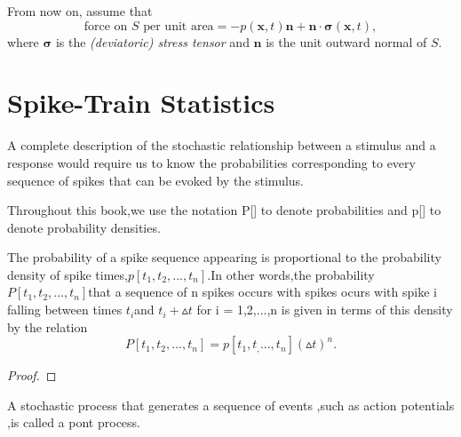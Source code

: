 
\begin{asm}
  \label{asm:surfaceForceViscous}
  From now on,
  assume that
  \begin{equation}
    \label{eq:surfaceForceSigma}
    \text{force on $S$ per unit area} = -p(\mathbf{x},t)\mathbf{n}+\mathbf{n}\cdot\boldsymbol\sigma(\mathbf{x},t),
  \end{equation}
  where $\boldsymbol\sigma$ is the \emph{(deviatoric) stress tensor} and
  $\mathbf{n}$ is the unit outward normal of $S$.
\end{asm}


\section{Spike-Train Statistics}
\label{sec:1.4}


\begin{defn}
    A complete description of the stochastic relationship between a stimulus and a response would require us to know the probabilities corresponding to every sequence of spikes that can be evoked by the stimulus.    
\end{defn}

\begin{defn}    
    Throughout this book,we use the notation P[] to denote probabilities and p[] to denote probability densities.
\end{defn}    

\begin{thm}
    The probability of a spike sequence appearing is proportional to the probability density of spike times,$p[t_1,t_2,...,t_n]$.In other words,the probability $P[t_1,t_2,...,t_n]$that a sequence of n spikes occurs with spikes ocurs with spike i falling between times $t_i$and $t_i+\vartriangle t$ for i = 1,2,...,n is given in terms of this density by the relation 
    \begin{equation}
        P[t_1,t_2,...,t_n]=p[t_1,t_,...,t_n](\vartriangle t)^n.        
    \end{equation}
    \begin{proof}
    \end{proof}
\end{thm}

\begin{defn}
    A stochastic process that generates a sequence of events ,such as action potentials ,is called a pont process.    
\end{defn}

